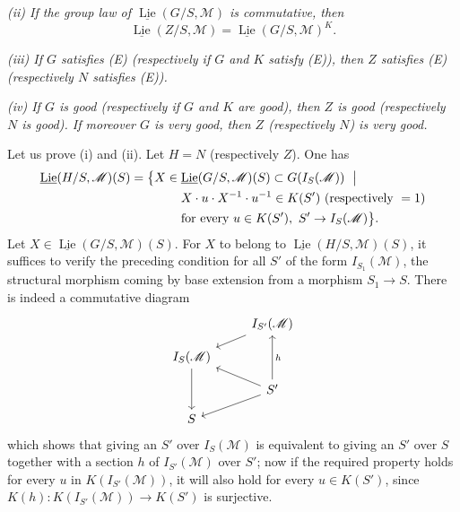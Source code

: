 \textit{(ii) If the group law of
\(\underline{\operatorname{Lie}}(G/S,\mathscr M)\) is commutative, then}
\[
 \underline{\operatorname{Lie}}(Z/S,\mathscr M)
   =\underline{\operatorname{Lie}}(G/S,\mathscr M)^K .
\]

\textit{(iii) If \(G\) satisfies (E) \textup{(}respectively if \(G\) and
\(K\) satisfy (E)\textup{)}, then \(Z\) satisfies (E) \textup{(}respectively
\(N\) satisfies (E)\textup{)}.}

\textit{(iv) If \(G\) is good \textup{(}respectively if \(G\) and \(K\) are
good\textup{)}, then \(Z\) is good \textup{(}respectively \(N\) is
good\textup{)}. If moreover \(G\) is very good, then \(Z\)
\textup{(}respectively \(N\)\textup{)} is very good.}

Let us prove (i) and (ii). Let \(H=N\) (respectively \(Z\)). One has
\[
\begin{split}
 \underline{\operatorname{Lie}}(H/S,\mathscr M)(S)
 =\bigl\{X\in{}&\underline{\operatorname{Lie}}(G/S,\mathscr M)(S)
   \subset G(I_S(\mathscr M))\ \bigm|\\
 &X\cdot u\cdot X^{-1}\cdot u^{-1}\in K(S')\
   \text{(respectively }=1\text{)}\\
 &\text{for every }u\in K(S'),\ S'\to I_S(\mathscr M)\bigr\}.
\end{split}
\]
Let \(X\in\underline{\operatorname{Lie}}(G/S,\mathscr M)(S)\). For \(X\)
to belong to \(\underline{\operatorname{Lie}}(H/S,\mathscr M)(S)\), it
suffices to verify the preceding condition for all \(S'\) of the form
\(I_{S_1}(\mathscr M)\), the structural morphism coming by base extension
from a morphism \(S_1\to S\). There is indeed a commutative diagram
\[
\begin{tikzcd}[row sep=small]
 & I_{S'}(\mathscr M) \arrow[dl] \\
 I_S(\mathscr M) \arrow[dd] & \\
 & S' \arrow[uu,"h"'] \arrow[ul] \arrow[dl] \\
 S &
\end{tikzcd}
\]
which shows that giving an \(S'\) over \(I_S(\mathscr M)\) is equivalent
to giving an \(S'\) over \(S\) together with a section \(h\) of
\(I_{S'}(\mathscr M)\) over \(S'\); now if the required property holds for
every \(u\) in \(K(I_{S'}(\mathscr M))\), it will also hold for every
\(u\in K(S')\), since
\(K(h)\colon K(I_{S'}(\mathscr M))\to K(S')\) is surjective.


